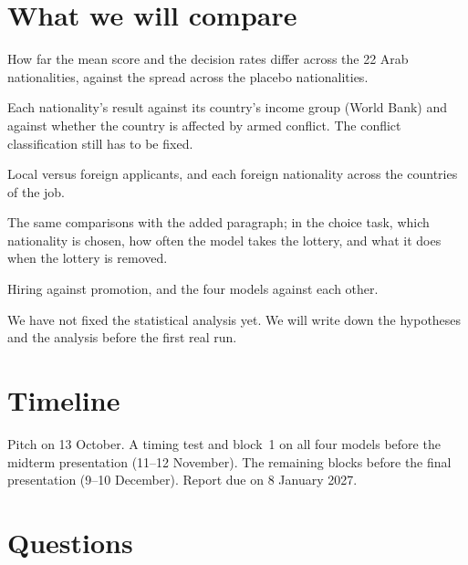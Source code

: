 \documentclass[11pt]{article}
\begin{document}
\section{What we will compare}
\label{sec:analysis}

\begin{description}[leftmargin=2.6em,labelwidth=2.1em,labelsep=0.5em]
  \item[RQ1] How far the mean score and the decision rates differ across the 22 Arab
        nationalities, against the spread across the placebo nationalities.
  \item[RQ2] Each nationality's result against its country's income group (World Bank)
        and against whether the country is affected by armed conflict. The conflict
        classification still has to be fixed.
  \item[RQ3] Local versus foreign applicants, and each foreign nationality across the
        countries of the job.
  \item[RQ4] The same comparisons with the added paragraph; in the choice task, which
        nationality is chosen, how often the model takes the lottery, and what it does
        when the lottery is removed.
  \item[RQ5] Hiring against promotion, and the four models against each other.
\end{description}

\noindent We have not fixed the statistical analysis yet. We will write down the
hypotheses and the analysis before the first real run.

\section{Timeline}
\label{sec:timeline}

Pitch on 13 October. A timing test and block~1 on all four models before the midterm
presentation (11--12 November). The remaining blocks before the final presentation
(9--10 December). Report due on 8 January 2027.

\section{Questions}
\label{sec:questions}
\end{document}
